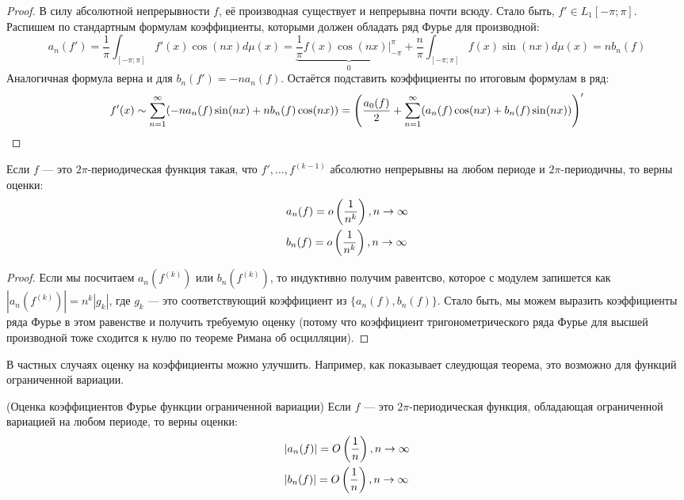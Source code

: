 \begin{proof}
	В силу абсолютной непрерывности $f$, её производная существует и непрерывна почти всюду. Стало быть, $f' \in L_1[-\pi; \pi]$. Распишем по стандартным формулам коэффициенты, которыми должен обладать ряд Фурье для производной:
	\[
		a_n(f') = \frac{1}{\pi} \int_{[-\pi; \pi]} f'(x)\cos(nx)d\mu(x) = \underbrace{\frac{1}{\pi} f(x)\cos(nx)\Big|_{-\pi}^\pi}_{0} + \frac{n}{\pi} \int_{[-\pi; \pi]} f(x)\sin(nx)d\mu(x) = nb_n(f)
	\]
	Аналогичная формула верна и для $b_n(f') = -na_n(f)$. Остаётся подставить коэффициенты по итоговым формулам в ряд:
	\[
		f'(x) \sim \sum_{n = 1}^\infty (-na_n(f)\sin(nx) + nb_n(f)\cos(nx)) = \left(\frac{a_0(f)}{2} + \sum_{n = 1}^\infty (a_n(f)\cos(nx) + b_n(f)\sin(nx))\right)'
	\]
\end{proof}

\begin{corollary}
	Если $f$ --- это $2\pi$-периодическая функция такая, что $f', \ldots, f^{(k - 1)}$ абсолютно непрерывны на любом периоде и $2\pi$-периодичны, то верны оценки:
	\begin{align*}
		&{a_n(f) = o\left(\frac{1}{n^k}\right), n \to \infty}
		\\
		&{b_n(f) = o\left(\frac{1}{n^k}\right), n \to \infty}
	\end{align*}
\end{corollary}

\begin{proof}
	Если мы посчитаем $a_n(f^{(k)})$ или $b_n(f^{(k)})$, то индуктивно получим равентсво, которое с модулем запишется как \(|a_n(f^{(k)})| = n^k|g_k|\), где $g_k$ --- это соответствующий коэффициент из $\{a_n(f), b_n(f)\}$. Стало быть, мы можем выразить коэффициенты ряда Фурье в этом равенстве и получить требуемую оценку (потому что коэффициент тригонометрического ряда Фурье для высшей производной тоже сходится к нулю по теореме Римана об осцилляции).
\end{proof}

\begin{note}
	В частных случаях оценку на коэффициенты можно улучшить. Например, как показывает слеудющая теорема, это возможно для функций ограниченной вариации.
\end{note}

\begin{theorem} (Оценка коэффициентов Фурье функции ограниченной вариации)
	Если $f$ --- это $2\pi$-периодическая функция, обладающая ограниченной вариацией на любом периоде, то верны оценки:
	\begin{align*}
		&{|a_n(f)| = O\left(\frac{1}{n}\right), n \to \infty}
		\\
		&{|b_n(f)| = O\left(\frac{1}{n}\right), n \to \infty}
	\end{align*}
\end{theorem}

